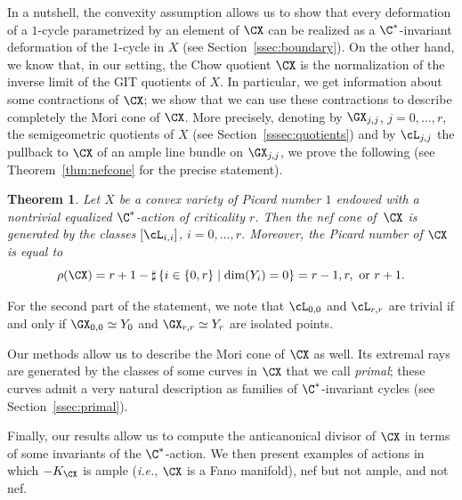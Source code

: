 \documentclass[11pt]{amsart}
\numberwithin{equation}{section}
\newtheorem{theorem}{Theorem}[section]
\theoremstyle{definition}
\theoremstyle{remark}
\begin{document}
In a nutshell, the convexity assumption allows us to show that every deformation of a $1$-cycle parametrized by an element of $\CX$ can be realized as a $\C^*$-invariant deformation of the $1$-cycle in $X$ (see Section~\ref{ssec:boundary}). 
On the other hand, we know that, in our setting, the Chow quotient $\CX$ is the normalization of the inverse limit of the GIT quotients of $X$. In particular, we get  information about some contractions of $\CX$; we show that we can use these contractions to describe completely the Mori cone of $\CX$. More precisely,  denoting by $\GX_{j,j}$, $j=0,\dots,r$, the semigeometric quotients of $X$ (see Section~\ref{sssec:quotients}) and  by $\cL_{j,j}$ the pullback to $\CX$ of an ample line bundle on $\GX_{j,j}$,  we  prove the following (see Theorem~\ref{thm:nefcone} for the precise statement). 

\begin{theorem}\label{thm:main2}
Let $X$ be a convex variety of Picard number $1$ endowed with a nontrivial equalized $\C^*$-action of criticality $r$. Then the nef cone of\, $\CX$ is generated by the classes $[\cL_{i,i}]$, $i=0,\dots,r$. 
Moreover, the Picard number of $\CX$ is equal to 
\[
\rho(\CX)=r+1-\sharp\left\{i\in\{0,r\}\mid \dim(Y_i)=0\right\}=r-1,r,\mbox{ or }r+1.
\]
\end{theorem}


For the second part of the statement, we note that $\cL_{0,0}$ and $\cL_{r,r}$ are trivial if and only if $\GX_{0,0}\simeq Y_0$ and $\GX_{r,r}\simeq Y_r$ are isolated points.

Our methods allow us to describe the Mori cone of $\CX$ as well. Its extremal rays are generated by the classes of some curves in $\CX$ that we call {\em primal}; these curves admit a very natural description as families of $\C^*$-invariant cycles (see Section~\ref{ssec:primal}).

Finally, our results allow us to compute the anticanonical divisor of $\CX$ in terms of some invariants of the $\C^*$-action. We then present  examples of actions in which $-K_{\CX}$ is ample (\textit{i.e.}, $\CX$ is a Fano manifold), nef but not ample, and not nef. 
\end{document}
